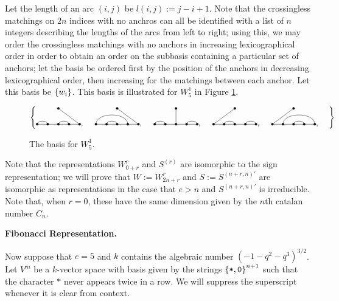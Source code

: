 \documentclass{amsart}
\newcommand{\fakesubsection}[1]{
  \vspace{7pt}
  \noindent \textbf{#1.}
}
\begin{document}
Let the length of an arc $(i,j)$ be $l(i,j) := j - i + 1$.
Note that the crossingless matchings on $2n$ indices with no anchros can all be identified with a list of $n$ integers describing the lengths of the arcs from left to right;
using this, we may order the crossingless matchings with no anchors in increasing lexicographical order in order to obtain an order on the subbasis containing a particular set of anchors;
let the basis be ordered first by the position of the anchors in decreasing lexicographical order, then increasing for the matchings between each anchor.
Let this basis be $\left\{ w_i \right\}$.
This basis is illustrated for $W_{5}^1$ in Figure \ref{S5 Basis}. 

\begin{figure} 
  \def\cbasisspacing{5mm}
  $\cbr{
    \begin{gathered}
      \GeneralizedMatching{5}{1/2, 3/4}{1}{5/1}{3/4}, \hspace{\cbasisspacing}
      \GeneralizedMatching{5}{1/4, 2/3}{1}{5/1}{3/4}, \hspace{\cbasisspacing}
      \GeneralizedMatching{5}{1/2, 4/5}{1}{3/1}{3/4}, \hspace{\cbasisspacing}
      \GeneralizedMatching{5}{2/3, 4/5}{1}{1/1}{3/4}, \hspace{\cbasisspacing}
      \GeneralizedMatching{5}{2/5, 3/4}{1}{1/1}{3/4}, \hspace{\cbasisspacing}
     \end{gathered}}$ 
    \caption{The basis for $W_5^1$.}
  \label{S5 Basis}
\end{figure} 

Note that the representations $W_{0 + r}^r$ and $S^{(r)}$ are isomorphic to the sign representation; 
we will prove that $W := W_{2n+r}^r$ and $S := S^{(n+r,n)'}$ are isomorphic as representations in the case that $e > n$ and $S^{(n+r,n)'}$ is irreducible.
Note that, when $r = 0$, these have the same dimension given by the $n$th catalan number $C_n$.
  
\def\vara{\alpha_1}
\def\varb{\alpha_2}
\def\varc{\varepsilon_1}
\def\vard{\delta}
\def\vare{\varepsilon_2}
\def\vs{\texttt{*}}
\def\vp{\texttt{0}}
\fakesubsection{Fibonacci Representation}
Now suppose that $e = 5$ and $k$ contains the algebraic number $(-1 - q^2 - q^3)^{3/2}$.
Let $V^m$ be a $k$-vector space with basis given by the strings $\cbr{\vs,\vp}^{n+1}$ such that the character $\vs$ never appears twice in a row. 
We will suppress the superscript whenever it is clear from context.
\end{document}
